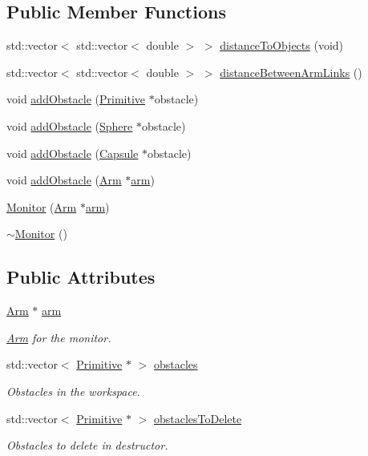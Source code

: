 \subsection*{Public Member Functions}
\begin{DoxyCompactItemize}
\item 
std\+::vector$<$ std\+::vector$<$ double $>$ $>$ \hyperlink{class_monitor_afefe8eeab13fd3f8f3c59ae53d25a00e}{distance\+To\+Objects} (void)
\item 
std\+::vector$<$ std\+::vector$<$ double $>$ $>$ \hyperlink{class_monitor_afe72152adc0d2d2faf8fb01563417033}{distance\+Between\+Arm\+Links} ()
\item 
void \hyperlink{class_monitor_a8c448bcff703af93489cc4f0847d4245}{add\+Obstacle} (\hyperlink{class_primitive}{Primitive} $\ast$obstacle)
\item 
void \hyperlink{class_monitor_af5979d8f05c2d945ddc055e329fad5d2}{add\+Obstacle} (\hyperlink{class_sphere}{Sphere} $\ast$obstacle)
\item 
void \hyperlink{class_monitor_a192497730489ebcd6a6580875cfbeee3}{add\+Obstacle} (\hyperlink{class_capsule}{Capsule} $\ast$obstacle)
\item 
void \hyperlink{class_monitor_a580dedf3090ffff7a452dbe32cc585f4}{add\+Obstacle} (\hyperlink{class_arm}{Arm} $\ast$\hyperlink{class_monitor_a8b75571f6224f999a3dc05cf9a83fa68}{arm})
\item 
\hyperlink{class_monitor_adda7d547e1226e159836356dd8af14bb}{Monitor} (\hyperlink{class_arm}{Arm} $\ast$\hyperlink{class_monitor_a8b75571f6224f999a3dc05cf9a83fa68}{arm})
\item 
\hyperlink{class_monitor_a64aba8195effc068092ddea5a71e8176}{$\sim$\+Monitor} ()
\end{DoxyCompactItemize}
\subsection*{Public Attributes}
\begin{DoxyCompactItemize}
\item 
\hyperlink{class_arm}{Arm} $\ast$ \hyperlink{class_monitor_a8b75571f6224f999a3dc05cf9a83fa68}{arm}
\begin{DoxyCompactList}\small\item\em \hyperlink{class_arm}{Arm} for the monitor. \end{DoxyCompactList}\item 
std\+::vector$<$ \hyperlink{class_primitive}{Primitive} $\ast$ $>$ \hyperlink{class_monitor_a05fd42482269ad65432d5400c8f0f9b5}{obstacles}
\begin{DoxyCompactList}\small\item\em Obstacles in the workspace. \end{DoxyCompactList}\item 
std\+::vector$<$ \hyperlink{class_primitive}{Primitive} $\ast$ $>$ \hyperlink{class_monitor_a2207169c2b32b3bbf9925f3254064dee}{obstacles\+To\+Delete}
\begin{DoxyCompactList}\small\item\em Obstacles to delete in destructor. \end{DoxyCompactList}\end{DoxyCompactItemize}


